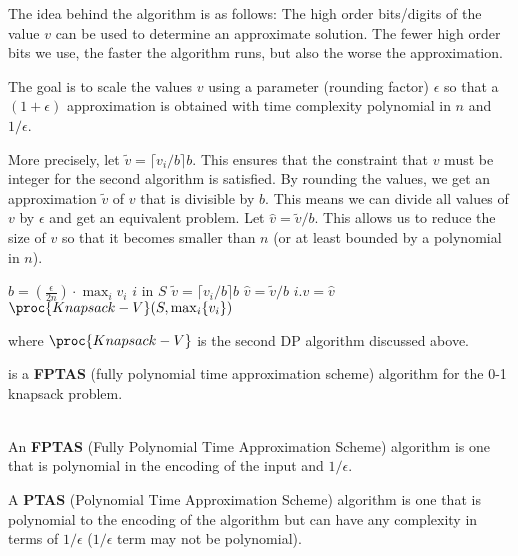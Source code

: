 The idea behind the algorithm is as follows: The high order bits/digits of the value $v$ can be used to determine an approximate solution. The fewer high order bits we use, the faster the algorithm runs, but also the worse the approximation.

The goal is to scale the values $v$ using a parameter (rounding factor) $\epsilon$ so that a $(1+\epsilon)$ approximation is obtained with time complexity polynomial in $n$ and $1/\epsilon$.

More precisely, let $\tilde{v} = \lceil v_i/b \rceil b$. This ensures that the constraint that $v$ must be integer for the second algorithm is satisfied. By rounding the values, we get an approximation $\tilde{v}$ of $v$ that is divisible by $b$. This means we can divide all values of $v$ by $\epsilon$ and get an equivalent problem. Let $\hat{v} = \tilde{v}/b$. This allows us to reduce the size of $v$ so that it becomes smaller than $n$ (or at least bounded by a polynomial in $n$).

\begin{codebox}
    \li $b = (\frac{\epsilon}{2n}) \cdot \max_i v_i$
    \li \For $i$ in $S$ \Do 
        \li $\tilde{v} = \lceil v_i/b \rceil b$
        \li $\hat{v} = \tilde{v}/b$
        \li $i.v = \hat{v}$
    \End
    \li $\proc{Knapsack-V}(S,\max_i\{v_i\})$ 
\end{codebox}
where $\proc{Knapsack-V}$ is the second DP algorithm discussed above.

 is a \textbf{FPTAS} (fully polynomial time approximation scheme) algorithm for the 0-1 knapsack problem.

\begin{definition}  
    \hfill \\
    An \textbf{FPTAS} (Fully Polynomial Time Approximation Scheme) algorithm is one that is polynomial in the encoding of the input and $1/\epsilon$.

    A \textbf{PTAS} (Polynomial Time Approximation Scheme) algorithm is one that is polynomial to the encoding of the algorithm but can have any complexity in terms of $1/\epsilon$ ($1/\epsilon$ term may not be polynomial).
\end{definition}